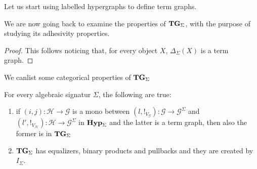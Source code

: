 \documentclass[runningheads,envcountsect]{lipics-v2021}
\newcommand{\catname}[1]{\textbf{\textup{#1}}}
\newcommand{\hyp}{\catname{Hyp}}
\newcommand{\tg}[0]{\catname{TG}_{\Sigma}}
\begin{document}
Let us start using labelled hypergraphs to define term graphs.




We are now going back to examine the properties of $\tg$, with the purpose of studying its adhesivity properties.

\begin{proof}
	This follows noticing that, for every object $X$, $\Delta_{\Sigma}(X)$ is a term graph.   
\end{proof}



We canlist some categorical properties of $\tg$


\begin{proposition}
For every algebraic signatur $\Sigma$, the following are true:
\begin{enumerate}
	\item if  $(i,j)\colon \mathcal{H}\to \mathcal{G}$ is a mono between  $(l, !_{V_\mathcal{G}})\colon \mathcal{G}\to \mathcal{G}^{\Sigma}$ and $(l', !_{V_\mathcal{H}})\colon \mathcal{H}\to \mathcal{G}^{\Sigma}$ in $\hyp_\Sigma$ and the latter is a term graph, then also the former is in $\tg$
	\item $\tg$ has equalizers, binary products and pullbacks and they are created by $I_\Sigma$.
\end{enumerate}
\end{proposition}
\end{document}
